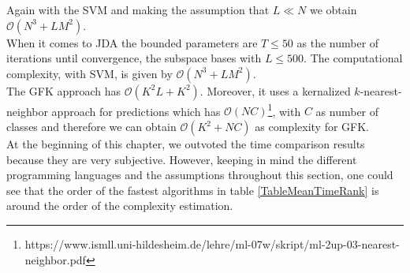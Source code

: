 Again with the \acs{SVM} and making the assumption that $L \ll N$ we obtain $\mathcal{O}(N^3+LM^2)$.\\
When it comes to \acs{JDA} the bounded parameters are $T \le 50$ as the number of iterations until convergence, the subspace bases with $L\le 500$.
The computational complexity, with \acs{SVM}, is given by $\mathcal{O}(N^3+LM^2)$.\\
The \acs{GFK} approach has $\mathcal{O}(K^2L+K^2)$.
Moreover, it uses a kernalized $k$-nearest-neighbor approach for predictions which has $\mathcal{O}(NC)$\footnote{https://www.ismll.uni-hildesheim.de/lehre/ml-07w/skript/ml-2up-03-nearest-neighbor.pdf}, with $C$ as number of classes and therefore we can obtain $\mathcal{O}(K^2+NC)$ as complexity for \acs{GFK}.\\
At the beginning of this chapter, we outvoted the time comparison results because they are very subjective.
However, keeping in mind the different programming languages and the assumptions throughout this section, one could see that the order of the fastest algorithms in table \ref{TableMeanTimeRank} is around the order of the complexity estimation.

\FloatBarrier
